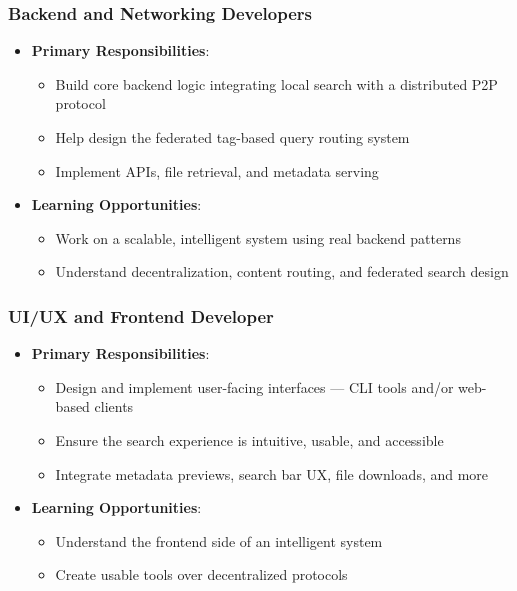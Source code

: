 \documentclass[11pt,a4paper]{article}
\begin{document}
\subsubsection{Backend and Networking Developers}
\begin{itemize}
    \item \textbf{Primary Responsibilities}:
    \begin{itemize}
        \item Build core backend logic integrating local search with a distributed P2P protocol
        \item Help design the federated tag-based query routing system
        \item Implement APIs, file retrieval, and metadata serving
    \end{itemize}
    \item \textbf{Learning Opportunities}:
    \begin{itemize}
        \item Work on a scalable, intelligent system using real backend patterns
        \item Understand decentralization, content routing, and federated search design
    \end{itemize}
\end{itemize}

\subsubsection{UI/UX and Frontend Developer}
\begin{itemize}
    \item \textbf{Primary Responsibilities}:
    \begin{itemize}
        \item Design and implement user-facing interfaces — CLI tools and/or web-based clients
        \item Ensure the search experience is intuitive, usable, and accessible
        \item Integrate metadata previews, search bar UX, file downloads, and more
    \end{itemize}
    \item \textbf{Learning Opportunities}:
    \begin{itemize}
        \item Understand the frontend side of an intelligent system
        \item Create usable tools over decentralized protocols
    \end{itemize}
\end{itemize}
\end{document}
